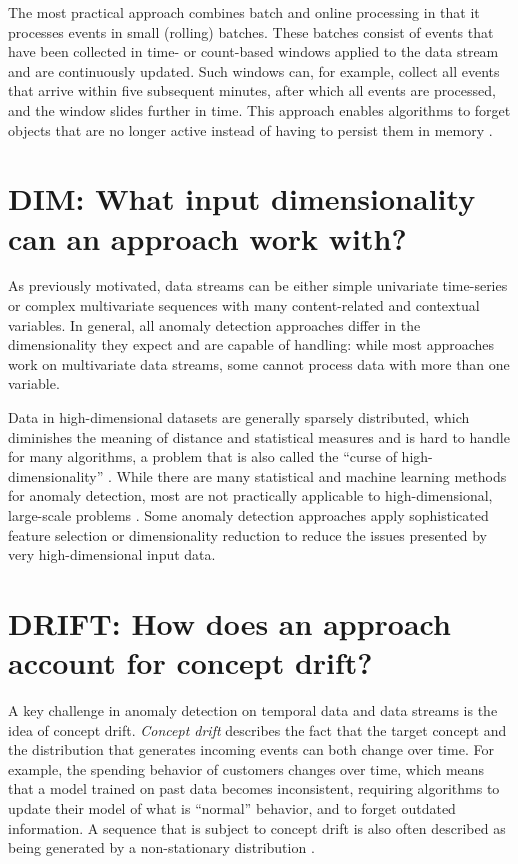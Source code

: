 The most practical approach combines batch and online processing in that it processes events in small (rolling) batches. These batches consist of events that have been collected in time- or count-based windows applied to the data stream and are continuously updated. Such windows can, for example, collect all events that arrive within five subsequent minutes, after which all events are processed, and the window slides further in time. This approach enables algorithms to forget objects that are no longer active instead of having to persist them in memory \citep{kontaki_continuous_2011}.


\section{DIM: What input dimensionality can an approach work with?}

As previously motivated, data streams can be either simple univariate time-series or complex multivariate sequences with many content-related and contextual variables. In general, all anomaly detection approaches differ in the dimensionality they expect and are capable of handling: while most approaches work on multivariate data streams, some cannot process data with more than one variable.

Data in high-dimensional datasets are generally sparsely distributed, which diminishes the meaning of distance and statistical measures and is hard to handle for many algorithms, a problem that is also called the ``curse of high-dimensionality'' \citep{yoon_nets:_2019}. While there are many statistical and machine learning methods for anomaly detection, most are not practically applicable to high-dimensional, large-scale problems \citep{schneider_expected_2016}. Some anomaly detection approaches apply sophisticated feature selection or dimensionality reduction to reduce the issues presented by very high-dimensional input data.


\section{DRIFT: How does an approach account for concept drift?}
A key challenge in anomaly detection on temporal data and data streams is the idea of concept drift. \emph{Concept drift} describes the fact that the target concept and the distribution that generates incoming events can both change over time. For example, the spending behavior of customers changes over time, which means that a model trained on past data becomes inconsistent, requiring algorithms to update their model of what is ``normal'' behavior, and to forget outdated information. A sequence that is subject to concept drift is also often described as being generated by a non-stationary distribution \citep{tsymbal_problem_2004}.

